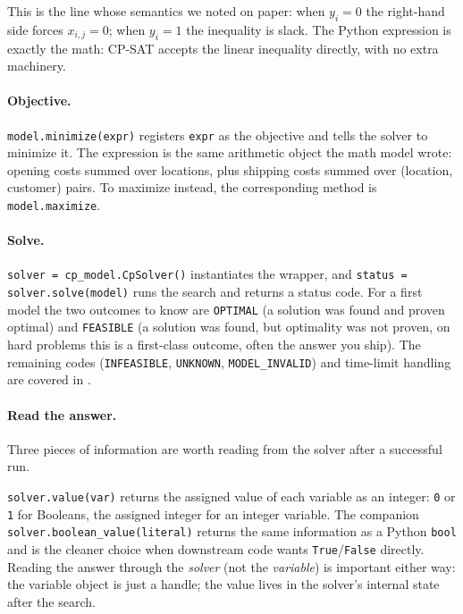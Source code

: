 This is the line whose semantics we noted on paper: when \(y_i = 0\) the
right-hand side forces \(x_{i,j} = 0\); when \(y_i = 1\) the inequality
is slack. The Python expression is exactly the math: CP-SAT accepts
the linear inequality directly, with no extra machinery.

\paragraph{Objective.} \lstinline!model.minimize(expr)!
registers \lstinline!expr! as the objective and tells the
solver to minimize it. The expression is the same arithmetic object the
math model wrote: opening costs summed over locations, plus shipping
costs summed over (location, customer) pairs. To maximize instead, the
corresponding method is \lstinline!model.maximize!.

\paragraph{Solve.} \lstinline!solver = cp_model.CpSolver()!
instantiates the wrapper, and
\lstinline!status = solver.solve(model)! runs the search
and returns a status code. For a first model the two outcomes to know
are \lstinline!OPTIMAL! (a solution was found and proven optimal) and
\lstinline!FEASIBLE! (a solution was found, but optimality was not
proven, on hard problems this is a first-class outcome, often the
answer you ship). The remaining codes (\lstinline!INFEASIBLE!,
\lstinline!UNKNOWN!, \lstinline!MODEL_INVALID!) and time-limit handling
are covered in .

\paragraph{Read the answer.} Three pieces of information are worth
reading from the solver after a successful run.

\lstinline!solver.value(var)! returns the assigned value
of each variable as an integer: \lstinline!0! or
\lstinline!1! for Booleans, the assigned integer for an
integer variable. The companion
\lstinline!solver.boolean_value(literal)! returns the
same information as a Python \lstinline!bool! and is the
cleaner choice when downstream code wants
\lstinline!True!/\lstinline!False! directly.
Reading the answer through the \emph{solver} (not the \emph{variable})
is important either way: the variable object is just a handle; the
value lives in the solver's internal state after the search.

